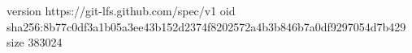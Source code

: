 version https://git-lfs.github.com/spec/v1
oid sha256:8b77c0df3a1b05a3ee43b152d2374f8202572a4b3b846b7a0df9297054d7b429
size 383024
